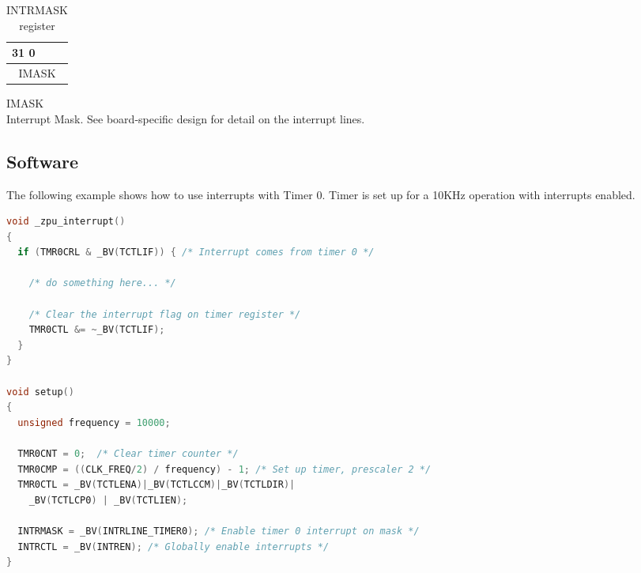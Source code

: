 \begin{table}[H]
\begin{center}
\begin{tabularx}{14cm}{X}
31 \hfill 0 \\

\hline
\multicolumn{1}{|c|}{IMASK} \\
\hline
\end{tabularx}
\caption{INTRMASK register}
\end{center}
\end{table}

\begin{description}
\item{IMASK} \hfill \\ Interrupt Mask. See board-specific design for detail on the interrupt lines.
\end{description}



\subsection{Software}

The following example shows how to use interrupts with Timer 0. 
Timer is set up for a 10KHz operation with interrupts enabled.
\begin{lstlisting}[language=C++]
void _zpu_interrupt()
{
  if (TMR0CRL & _BV(TCTLIF)) { /* Interrupt comes from timer 0 */
                
    /* do something here... */
                
    /* Clear the interrupt flag on timer register */
    TMR0CTL &= ~_BV(TCTLIF);
  }
}

void setup()
{
  unsigned frequency = 10000;
        
  TMR0CNT = 0;  /* Clear timer counter */
  TMR0CMP = ((CLK_FREQ/2) / frequency) - 1; /* Set up timer, prescaler 2 */
  TMR0CTL = _BV(TCTLENA)|_BV(TCTLCCM)|_BV(TCTLDIR)|
    _BV(TCTLCP0) | _BV(TCTLIEN);

  INTRMASK = _BV(INTRLINE_TIMER0); /* Enable timer 0 interrupt on mask */
  INTRCTL = _BV(INTREN); /* Globally enable interrupts */
}
\end{lstlisting}